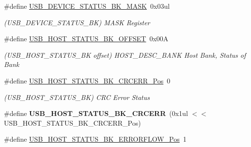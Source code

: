 \begin{DoxyCompactItemize}
\item 
\hypertarget{group___s_a_m_l21___u_s_b_ga579888f0bf6dec18f172a4b8d80b508a}{}\#define \hyperlink{group___s_a_m_l21___u_s_b_ga579888f0bf6dec18f172a4b8d80b508a}{U\+S\+B\+\_\+\+D\+E\+V\+I\+C\+E\+\_\+\+S\+T\+A\+T\+U\+S\+\_\+\+B\+K\+\_\+\+M\+A\+S\+K}~0x03ul\label{group___s_a_m_l21___u_s_b_ga579888f0bf6dec18f172a4b8d80b508a}

\begin{DoxyCompactList}\small\item\em (U\+S\+B\+\_\+\+D\+E\+V\+I\+C\+E\+\_\+\+S\+T\+A\+T\+U\+S\+\_\+\+B\+K) M\+A\+S\+K Register \end{DoxyCompactList}\item 
\hypertarget{group___s_a_m_l21___u_s_b_ga1382ea1ebed8e7cd8730f4b4463a1691}{}\#define \hyperlink{group___s_a_m_l21___u_s_b_ga1382ea1ebed8e7cd8730f4b4463a1691}{U\+S\+B\+\_\+\+H\+O\+S\+T\+\_\+\+S\+T\+A\+T\+U\+S\+\_\+\+B\+K\+\_\+\+O\+F\+F\+S\+E\+T}~0x00\+A\label{group___s_a_m_l21___u_s_b_ga1382ea1ebed8e7cd8730f4b4463a1691}

\begin{DoxyCompactList}\small\item\em (U\+S\+B\+\_\+\+H\+O\+S\+T\+\_\+\+S\+T\+A\+T\+U\+S\+\_\+\+B\+K offset) H\+O\+S\+T\+\_\+\+D\+E\+S\+C\+\_\+\+B\+A\+N\+K Host Bank, Status of Bank \end{DoxyCompactList}\item 
\hypertarget{group___s_a_m_l21___u_s_b_ga1753ef6c4200f600ff2f99f4e7dd2266}{}\#define \hyperlink{group___s_a_m_l21___u_s_b_ga1753ef6c4200f600ff2f99f4e7dd2266}{U\+S\+B\+\_\+\+H\+O\+S\+T\+\_\+\+S\+T\+A\+T\+U\+S\+\_\+\+B\+K\+\_\+\+C\+R\+C\+E\+R\+R\+\_\+\+Pos}~0\label{group___s_a_m_l21___u_s_b_ga1753ef6c4200f600ff2f99f4e7dd2266}

\begin{DoxyCompactList}\small\item\em (U\+S\+B\+\_\+\+H\+O\+S\+T\+\_\+\+S\+T\+A\+T\+U\+S\+\_\+\+B\+K) C\+R\+C Error Status \end{DoxyCompactList}\item 
\hypertarget{group___s_a_m_l21___u_s_b_ga4f15cbfc62ec3a588ca6a260dd42d249}{}\#define {\bfseries U\+S\+B\+\_\+\+H\+O\+S\+T\+\_\+\+S\+T\+A\+T\+U\+S\+\_\+\+B\+K\+\_\+\+C\+R\+C\+E\+R\+R}~(0x1ul $<$$<$ U\+S\+B\+\_\+\+H\+O\+S\+T\+\_\+\+S\+T\+A\+T\+U\+S\+\_\+\+B\+K\+\_\+\+C\+R\+C\+E\+R\+R\+\_\+\+Pos)\label{group___s_a_m_l21___u_s_b_ga4f15cbfc62ec3a588ca6a260dd42d249}

\item 
\hypertarget{group___s_a_m_l21___u_s_b_ga561f968ef18f6f772cbffe1a4d8c49a7}{}\#define \hyperlink{group___s_a_m_l21___u_s_b_ga561f968ef18f6f772cbffe1a4d8c49a7}{U\+S\+B\+\_\+\+H\+O\+S\+T\+\_\+\+S\+T\+A\+T\+U\+S\+\_\+\+B\+K\+\_\+\+E\+R\+R\+O\+R\+F\+L\+O\+W\+\_\+\+Pos}~1\label{group___s_a_m_l21___u_s_b_ga561f968ef18f6f772cbffe1a4d8c49a7}


\end{DoxyCompactItemize}

